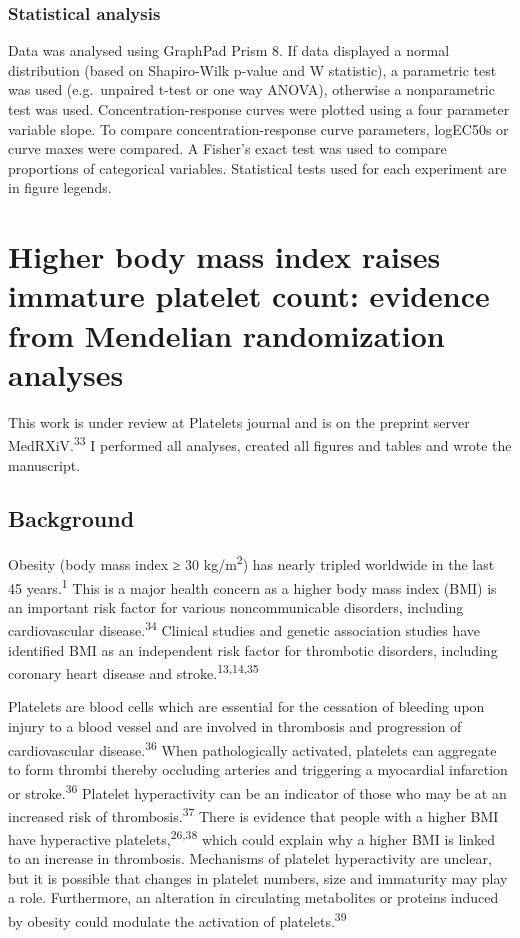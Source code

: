 \documentclass[11pt,twoside]{bristolthesis}
\begin{document}
\hypertarget{statistical-analysis}{%
\subsection{Statistical analysis}\label{statistical-analysis}}

Data was analysed using GraphPad Prism 8. If data displayed a normal distribution (based on Shapiro-Wilk p-value and W statistic), a parametric test was used (e.g.~unpaired t-test or one way ANOVA), otherwise a nonparametric test was used. Concentration-response curves were plotted using a four parameter variable slope. To compare concentration-response curve parameters, logEC50s or curve maxes were compared. A Fisher's exact test was used to compare proportions of categorical variables. Statistical tests used for each experiment are in figure legends.

\hypertarget{BMI-platelets-INTERVAL}{%
\chapter{Higher body mass index raises immature platelet count: evidence from Mendelian randomization analyses}\label{BMI-platelets-INTERVAL}}

This work is under review at Platelets journal and is on the preprint server MedRXiV.\textsuperscript{33} I performed all analyses, created all figures and tables and wrote the manuscript.

\hypertarget{background-1}{%
\section{Background}\label{background-1}}

Obesity (body mass index ≥ 30 kg/m\textsuperscript{2}) has nearly tripled worldwide in the last 45 years.\textsuperscript{1} This is a major health concern as a higher body mass index (BMI) is an important risk factor for various noncommunicable disorders, including cardiovascular disease.\textsuperscript{34} Clinical studies and genetic association studies have identified BMI as an independent risk factor for thrombotic disorders, including coronary heart disease and stroke.\textsuperscript{13,14,35}

Platelets are blood cells which are essential for the cessation of bleeding upon injury to a blood vessel and are involved in thrombosis and progression of cardiovascular disease.\textsuperscript{36} When pathologically activated, platelets can aggregate to form thrombi thereby occluding arteries and triggering a myocardial infarction or stroke.\textsuperscript{36} Platelet hyperactivity can be an indicator of those who may be at an increased risk of thrombosis.\textsuperscript{37} There is evidence that people with a higher BMI have hyperactive platelets,\textsuperscript{26,38} which could explain why a higher BMI is linked to an increase in thrombosis. Mechanisms of platelet hyperactivity are unclear, but it is possible that changes in platelet numbers, size and immaturity may play a role. Furthermore, an alteration in circulating metabolites or proteins induced by obesity could modulate the activation of platelets.\textsuperscript{39}
\end{document}
